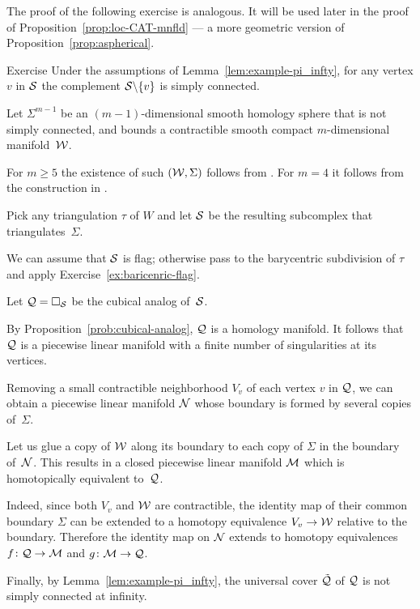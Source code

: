 The proof of the following exercise is analogous.
It will be used later in the proof of Proposition~\ref{prop:loc-CAT-mnfld} --- a more geometric version of Proposition~\ref{prop:aspherical}.

\begin{thm}{Exercise}\label{ex:example-pi_infty-new}
Under the assumptions of Lemma~\ref{lem:example-pi_infty}, 
for any vertex $v$ in $\mathcal{S}$
the complement $\mathcal{S}\backslash\{v\}$ is simply connected.
\end{thm}

Let $\Sigma^{m-1}$ be an $(m-1)$-dimensional smooth homology sphere that  is not simply connected, and bounds a contractible smooth compact $m$-dimensional manifold~$\mathcal{W}$. 

For $m\ge 5$ the existence of such $(\mathcal{W}, \Sigma)$ follows from \cite{kervaire}. 
For $m=4$ it follows from the construction in \cite{mazur}.

Pick any triangulation $\tau$ of $W$ and let $\mathcal{S}$ be the resulting subcomplex that triangulates~$\Sigma$.


We can assume that $\mathcal{S}$ is flag; 
otherwise pass to the barycentric subdivision 
of $\tau$ and apply Exercise~\ref{ex:baricenric-flag}.


Let $\mathcal{Q}=\square_{\mathcal{S}}$ be the cubical analog of~$\mathcal{S}$.

By Proposition~\ref{prob:cubical-analog},
$\mathcal{Q}$ is a homology manifold.
It follows that $\mathcal{Q}$ is a piecewise linear manifold 
with a finite number of singularities at its vertices.


Removing a small contractible neighborhood $V_v$ of each vertex $v$ in $\mathcal{Q}$,
we can obtain a piecewise linear manifold $\mathcal{N}$
whose boundary is formed by several copies of~$\Sigma$.

Let us glue a copy of  $\mathcal{W}$ along its boundary to each copy of $\Sigma$ in the boundary of~$\mathcal{N}$.
This results in a  closed piecewise linear manifold 
$\mathcal{M}$ which is homotopically equivalent to~$\mathcal{Q}$.

Indeed, since both $V_v$ and $\mathcal{W}$ are contractible, the identity map of  their common boundary $\Sigma$ can be extended to a homotopy equivalence $V_v\to\mathcal{W}$ relative to the boundary.
Therefore the identity map on $\mathcal{N}$ extends to homotopy equivalences 
$f\colon \mathcal{Q}\to \mathcal{M}$ and $g\colon\mathcal{M}\to \mathcal{Q}$.

Finally, by Lemma~\ref{lem:example-pi_infty},  
the universal cover $\tilde{\mathcal{Q}}$ of $\mathcal{Q}$
is not simply connected at infinity.


